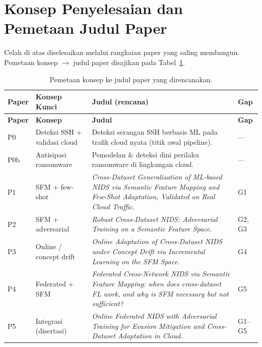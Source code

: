 \documentclass[11pt,a4paper]{article}
\begin{document}
\section{Konsep Penyelesaian dan Pemetaan Judul Paper}

Celah di atas diselesaikan melalui rangkaian paper yang saling membangun.
Pemetaan konsep $\rightarrow$ judul paper disajikan pada Tabel~\ref{tab:paper}.

\renewcommand{\arraystretch}{1.3}
\begin{longtable}{@{}>{\RaggedRight\arraybackslash}p{0.9cm}
                     >{\RaggedRight\arraybackslash}p{4.4cm}
                     >{\RaggedRight\arraybackslash}p{7.3cm}
                     >{\RaggedRight\arraybackslash}p{1.0cm}@{}}
\caption{Pemetaan konsep ke judul paper yang direncanakan.}\label{tab:paper}\\
\toprule
\textbf{Paper} & \textbf{Konsep Kunci} & \textbf{Judul (rencana)} & \textbf{Gap} \\
\midrule
\endfirsthead
\toprule
\textbf{Paper} & \textbf{Konsep} & \textbf{Judul} & \textbf{Gap} \\
\midrule
\endhead
\bottomrule
\endlastfoot

P0 & Deteksi SSH + validasi cloud &
Deteksi serangan SSH berbasis ML pada trafik cloud nyata (titik awal pipeline).
& --- \\

P0b & Antisipasi ransomware &
Pemodelan \& deteksi dini perilaku ransomware di lingkungan cloud. & --- \\

P1 & SFM + few-shot &
\emph{Cross-Dataset Generalization of ML-based NIDS via Semantic Feature
Mapping and Few-Shot Adaptation, Validated on Real Cloud Traffic.} & G1 \\

P2 & SFM + adversarial &
\emph{Robust Cross-Dataset NIDS: Adversarial Training on a Semantic Feature
Space.} & G2, G3 \\

P3 & Online / concept drift &
\emph{Online Adaptation of Cross-Dataset NIDS under Concept Drift via
Incremental Learning on the SFM Space.} & G4 \\

P4 & Federated + SFM &
\emph{Federated Cross-Network NIDS via Semantic Feature Mapping: when does
cross-dataset FL work, and why is SFM necessary but not sufficient?} & G5 \\

P5 & Integrasi (disertasi) &
\emph{Online Federated NIDS with Adversarial Training for Evasion Mitigation
and Cross-Dataset Adaptation in Cloud.} & G1--G5 \\

\end{longtable}
\end{document}
